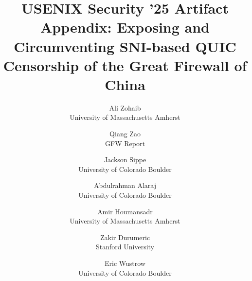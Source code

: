 \usepackage{array}

\renewcommand{\tabularxcolumn}[1]{>{\raggedright\arraybackslash}m{#1}}


%
%
%
%
\usepackage[available,functional,reproduced]{usenixbadges}




\date{}

\title{USENIX Security '25 Artifact Appendix: Exposing and Circumventing SNI-based QUIC Censorship of the Great Firewall of China}



\author{
{\rm Ali Zohaib}\footnotemark[1]\\
University of Massachusetts Amherst
\and
{\rm Qiang Zao}\footnotemark[1]\\
GFW Report
\and
{\rm Jackson Sippe}\\
University of Colorado Boulder
\and
{\rm Abdulrahman Alaraj}\\
University of Colorado Boulder
\and
{\rm Amir Houmansadr}\\
University of Massachusetts Amherst
\and
{\rm Zakir Durumeric}\\
Stanford University
\and
{\rm Eric Wustrow}\\
University of Colorado Boulder
} %

\maketitle

\def\thefootnote{*}\def
\thefootnote{\arabic{footnote}}





